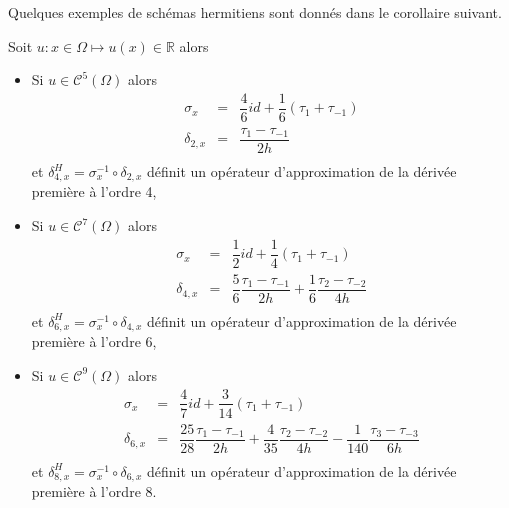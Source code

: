 Quelques exemples de schémas hermitiens sont donnés dans le corollaire suivant.

\begin{corollaire}
Soit $u : x \in \Omega \mapsto u(x) \in \mathbb{R}$ alors 
\begin{itemize}
\item Si $u \in \mathcal{C}^{5}(\Omega)$ alors 
\begin{equation}
\begin{array}{rcl}
\sigma_{x} &=& \dfrac{4}{6} id + \dfrac{1}{6} \left( \tau_1 + \tau_{-1} \right)\\
\delta_{2,x} &=& \dfrac{\tau_1 - \tau_{-1}}{2h} \\ 
\end{array}
\label{eq:comp4}
\end{equation}
et $\delta^H_{4,x} = \sigma_x^{-1} \circ \delta_{2,x}$ définit un opérateur d'approximation de la dérivée première à l'ordre 4,

\item Si $u \in \mathcal{C}^{7}(\Omega)$ alors 
\begin{equation}
\begin{array}{rcl}
\sigma_{x} &=& \dfrac{1}{2} id + \dfrac{1}{4}\left( \tau_1 + \tau_{-1} \right) \\
\delta_{4,x} &=& \dfrac{5}{6} \dfrac{\tau_1 - \tau_{-1}}{2h} + \dfrac{1}{6} \dfrac{\tau_2 - \tau_{-2}}{4h}\\ 
\end{array}
\label{eq:comp6}
\end{equation}
et $\delta^H_{6,x} = \sigma_{x}^{-1} \circ \delta_{4,x}$ définit un opérateur d'approximation de la dérivée première à l'ordre 6,


\item Si $u \in \mathcal{C}^{9}(\Omega)$ alors 
\begin{equation}
\begin{array}{rcl}
\sigma_{x} &=& \dfrac{4}{7} id + \dfrac{3}{14}\left( \tau_1 + \tau_{-1} \right) \\
\delta_{6,x} &=& \dfrac{25}{28} \dfrac{\tau_1 - \tau_{-1}}{2h} + \dfrac{4}{35} \dfrac{\tau_2 - \tau_{-2}}{4h} - \dfrac{1}{140} \dfrac{\tau_3 - \tau_{-3}}{6h} \\ 
\end{array}
\label{eq:comp8}
\end{equation}
et $\delta^H_{8,x} = \sigma_{x}^{-1} \circ \delta_{6,x}$ définit un opérateur d'approximation de la dérivée première à l'ordre 8.

\end{itemize}
\end{corollaire}

